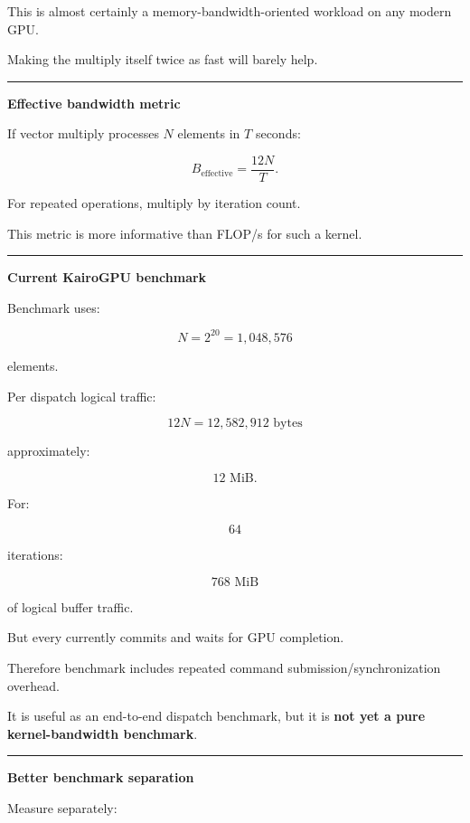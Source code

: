 This is almost certainly a memory-bandwidth-oriented workload on any modern GPU.

Making the multiply itself twice as fast will barely help.

\begin{center}\rule{0.5\linewidth}{0.5pt}\end{center}

\textbf{Effective bandwidth metric}

If vector multiply processes \(N\) elements in \(T\) seconds:

\[
\boxed{
B_{\text{effective}}
=
\frac{
12N
}{
T
}.
}
\]

For repeated operations, multiply by iteration count.

This metric is more informative than FLOP/s for such a kernel.

\begin{center}\rule{0.5\linewidth}{0.5pt}\end{center}

\textbf{Current KairoGPU benchmark}

Benchmark uses:

\[
N=2^{20}
=
1,048,576
\]

elements.

Per dispatch logical traffic:

\[
12N
=
12,582,912\text{ bytes}
\]

approximately:

\[
12\text{ MiB}.
\]

For:

\[
64
\]

iterations:

\[
768\text{ MiB}
\]

of logical buffer traffic.

But every  currently commits and waits for GPU completion.

Therefore benchmark includes repeated command submission/synchronization overhead.

It is useful as an end-to-end dispatch benchmark, but it is \textbf{not yet a pure kernel-bandwidth benchmark}.

\begin{center}\rule{0.5\linewidth}{0.5pt}\end{center}

\textbf{Better benchmark separation}

Measure separately:

